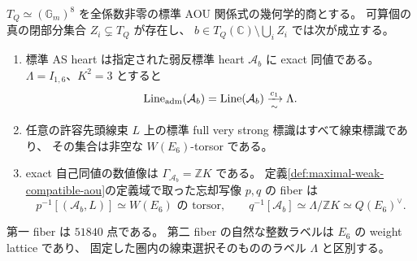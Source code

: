 \begin{theorem}
\label{thm:actual-aou-very-general}
$T_Q\simeq(\mathbb G_m)^8$ を全係数非零の標準 AOU 関係式の幾何学的商とする。
可算個の真の閉部分集合 $Z_i\subsetneq T_Q$ が存在し、
$b\in T_Q(\mathbb C)\setminus\bigcup_iZ_i$ では次が成立する。
\begin{enumerate}
\item 標準 AS heart は指定された弱反標準 heart $\mathcal A_b$ に exact 同値である。
      $\Lambda=I_{1,6}$、$K^2=3$ とすると
      \[
       \operatorname{Line}_{\rm adm}(\mathcal A_b)
       =\operatorname{Line}(\mathcal A_b)
       \xrightarrow[\sim]{c_1}\Lambda.
      \]
\item 任意の許容先頭線束 $L$ 上の標準 full very strong 標識はすべて線束標識であり、
      その集合は非空な $W(E_6)$-torsor である。
\item exact 自己同値の数値像は
      $\Gamma_{\mathcal A_b}=\mathbb ZK$ である。
      定義\ref{def:maximal-weak-compatible-aou}の定義域で取った忘却写像 $p,q$ の fiber は
      \[
       p^{-1}[(\mathcal A_b,L)]\simeq W(E_6)\text{ の torsor},\qquad
       q^{-1}[\mathcal A_b]\simeq\Lambda/\mathbb ZK
         \simeq Q(E_6)^\vee.
      \]
\end{enumerate}
第一 fiber は $51840$ 点である。
第二 fiber の自然な整数ラベルは $E_6$ の weight lattice であり、
固定した圏内の線束選択そのもののラベル $\Lambda$ と区別する。
\end{theorem}
